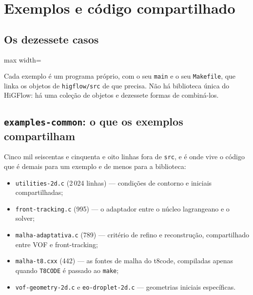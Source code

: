 \section{Exemplos e c\'odigo compartilhado}

\subsection{Os dezessete casos}

\begin{adjustbox}{max width=\linewidth}
\end{adjustbox}

Cada exemplo \'e um programa pr\'oprio, com o seu \texttt{main} e o seu
\texttt{Makefile}, que linka os objetos de \texttt{higflow/src} de que precisa.
N\~ao h\'a biblioteca \'unica do HiGFlow: h\'a uma cole\c{c}\~ao de objetos e
dezessete formas de combin\'a-los.

\subsection{\texttt{examples-common}: o que os exemplos compartilham}

Cinco mil seiscentas e cinquenta e oito linhas fora de \texttt{src}, e \'e onde
vive o c\'odigo que \'e demais para um exemplo e de menos para a biblioteca:

\begin{itemize}
  \item \texttt{utilities-2d.c} (2\,024 linhas) --- condi\c{c}\~oes de contorno e
    iniciais compartilhadas;
  \item \texttt{front-tracking.c} (995) --- o adaptador entre o n\'ucleo
    lagrangeano e o solver;
  \item \texttt{malha-adaptativa.c} (789) --- crit\'erio de refino e
    reconstru\c{c}\~ao, compartilhado entre VOF e front-tracking;
  \item \texttt{malha-t8.cxx} (442) --- as fontes de malha do t8code, compiladas
    apenas quando \texttt{T8CODE} \'e passado ao \texttt{make};
  \item \texttt{vof-geometry-2d.c} e \texttt{eo-droplet-2d.c} --- geometrias
    iniciais espec\'ificas.
\end{itemize}

